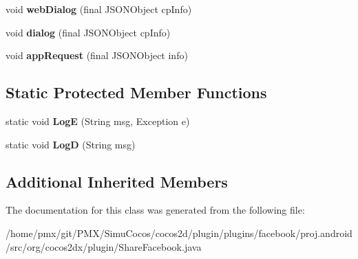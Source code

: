 \begin{DoxyCompactItemize}
\item 
\mbox{\label{classorg_1_1cocos2dx_1_1plugin_1_1ShareFacebook_a33712c037ee95fe2d924d6c4ba03edae}} 
void {\bfseries web\+Dialog} (final J\+S\+O\+N\+Object cp\+Info)
\item 
\mbox{\label{classorg_1_1cocos2dx_1_1plugin_1_1ShareFacebook_a5a10f92b177872ed45996b63c35474fa}} 
void {\bfseries dialog} (final J\+S\+O\+N\+Object cp\+Info)
\item 
\mbox{\label{classorg_1_1cocos2dx_1_1plugin_1_1ShareFacebook_a473c4a487336ba35323110fd92c0fbbc}} 
void {\bfseries app\+Request} (final J\+S\+O\+N\+Object info)
\end{DoxyCompactItemize}
\subsection*{Static Protected Member Functions}
\begin{DoxyCompactItemize}
\item 
\mbox{\label{classorg_1_1cocos2dx_1_1plugin_1_1ShareFacebook_ac3db45b635184fb3e6bafdf4988c7704}} 
static void {\bfseries LogE} (String msg, Exception e)
\item 
\mbox{\label{classorg_1_1cocos2dx_1_1plugin_1_1ShareFacebook_abd85977dbbd9c163a0830c187636ac73}} 
static void {\bfseries LogD} (String msg)
\end{DoxyCompactItemize}
\subsection*{Additional Inherited Members}


The documentation for this class was generated from the following file\+:\begin{DoxyCompactItemize}
\item 
/home/pmx/git/\+P\+M\+X/\+Simu\+Cocos/cocos2d/plugin/plugins/facebook/proj.\+android/src/org/cocos2dx/plugin/Share\+Facebook.\+java\end{DoxyCompactItemize}
